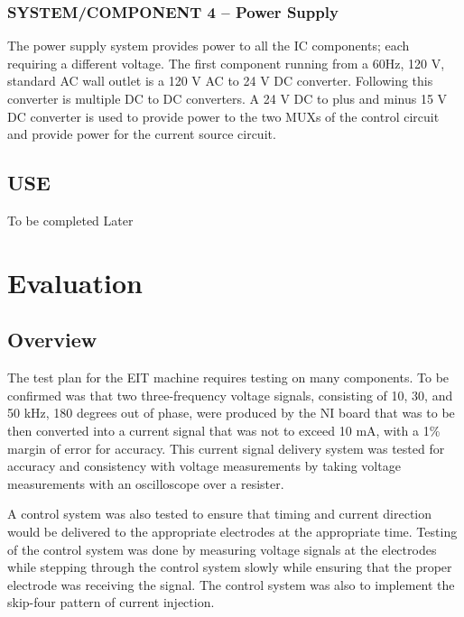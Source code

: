 \documentclass[12pt]{article}
\begin{document}
\subsubsection{SYSTEM/COMPONENT 4 -- Power Supply}\label{systemcomponent-4-power-supply}


The power supply system provides power to all the IC components; each
requiring a different voltage. The first component running from a 60Hz,
120 V, standard AC wall outlet is a 120 V AC to 24 V DC converter.
Following this converter is multiple DC to DC converters. A 24 V DC to
plus and minus 15 V DC converter is used to provide power to the two
MUXs of the control circuit and provide power for the current source
circuit.

\subsection{USE}\label{use}

To be completed Later

\section{Evaluation}\label{evaluation}

\subsection{Overview}\label{overview-1}

The test plan for the EIT machine requires testing on many components.
To be confirmed was that two three-frequency voltage signals, consisting
of 10, 30, and 50 kHz, 180 degrees out of phase, were produced by the NI
board that was to be then converted into a current signal that was not
to exceed 10 mA, with a 1\% margin of error for accuracy. This current
signal delivery system was tested for accuracy and consistency with
voltage measurements by taking voltage measurements with an oscilloscope
over a resister.

A control system was also tested to ensure that timing and current
direction would be delivered to the appropriate electrodes at the
appropriate time. Testing of the control system was done by measuring
voltage signals at the electrodes while stepping through the control
system slowly while ensuring that the proper electrode was receiving the
signal. The control system was also to implement the skip-four pattern
of current injection.
\end{document}

